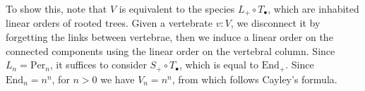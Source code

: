 \documentclass[fleqn]{article}
\theoremstyle{theorem}
\theoremstyle{definition}
\begin{document}
To show this, note that $V$ is equivalent to the species $L_{+} \circ
T_{\bullet}$, which are inhabited linear orders of rooted trees.  Given a
vertebrate $v : V$, we disconnect it by forgetting the links between vertebrae,
then we induce a linear order on the connected components using the linear
order on the vertebral column.  Since $L_{n} = \mathrm{Per}_{n}$, it suffices
to consider $S_{+} \circ T_{\bullet}$, which is equal to $\mathrm{End}_{+}$.
Since $\mathrm{End}_{n} = n^{n}$, for $n > 0$ we have $V_{n} = n^{n}$, from
which follows Cayley's formula.








\end{document}
